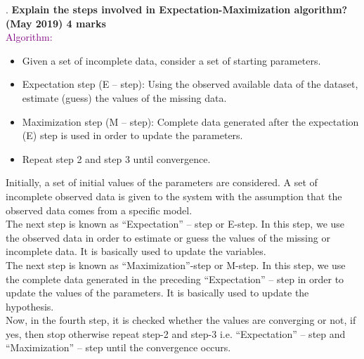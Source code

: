 .
\textbf{\textcolor{LightMagenta}{Explain the steps involved in Expectation-Maximization algorithm?(May 2019) \hfill 4 marks}} \\[5pt]
\textcolor{purple}{Algorithm:}
\begin{itemize}
    \item Given a set of incomplete data, consider a set of starting parameters.
    \item Expectation step (E – step): Using the observed available data of the dataset,
estimate (guess) the values of the missing data.
    \item Maximization step (M – step): Complete data generated after the expectation (E)
step is used in order to update the parameters.
    \item Repeat step 2 and step 3 until convergence.
\end{itemize}
Initially, a set of initial values of the parameters are considered. A set of incomplete
observed data is given to the system with the assumption that the observed data comes
from a specific model.
\\
The next step is known as “Expectation” – step or E-step. In this step, we use the
observed data in order to estimate or guess the values of the missing or incomplete
data. It is basically used to update the variables.
\\
The next step is known as “Maximization”-step or M-step. In this step, we use the
complete data generated in the preceding “Expectation” – step in order to update the
values of the parameters. It is basically used to update the hypothesis.
\\
Now, in the fourth step, it is checked whether the values are converging or not, if yes,
then stop otherwise repeat step-2 and step-3 i.e. “Expectation” – step and
“Maximization” – step until the convergence occurs.
\\
